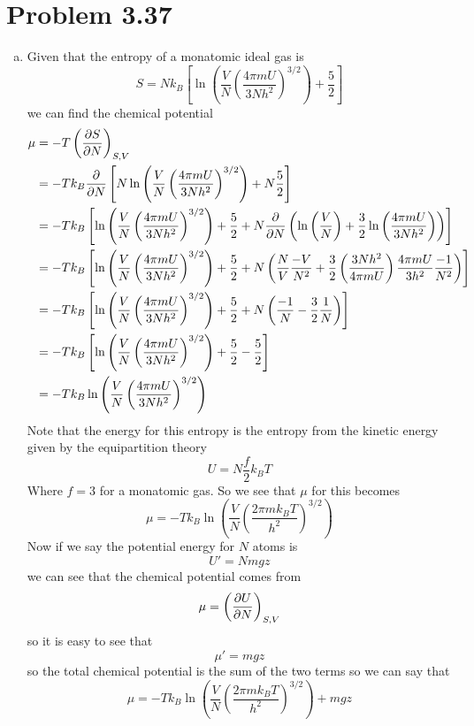 \documentclass[11pt]{article}
\numberwithin{equation}{section}
\begin{document}
\section{Problem 3.37}
\begin{enumerate}[(a)]
\item
Given that the entropy of a monatomic ideal gas is
$$S = Nk_B\left[\ln\left(\frac{V}{N}\left(\frac{4\pi mU}{3Nh^2}\right)^{3/2}\right)+\frac{5}{2}\right]$$
we can find the chemical potential 
\begin{align*}
\mu &= -T\left(\frac{\partial{S}}{\partial{N}}\right)_{S,V}\\
&= -Tk_B\frac{\partial{}}{\partial{N}}\left[N\ln\left(\frac{V}{N}\left(\frac{4\pi mU}{3Nh^2}\right)^{3/2}\right)+N\frac{5}{2}\right]\\
&= -Tk_B\left[\ln\left(\frac{V}{N}\left(\frac{4\pi mU}{3Nh^2}\right)^{3/2}\right)+ \frac{5}{2} + N\frac{\partial{}}{\partial{N}}\left(\ln\left(\frac{V}{N}\right) + \frac{3}{2}\ln\left(\frac{4\pi mU}{3Nh^2}\right)\right) \right]\\
&= -Tk_B\left[\ln\left(\frac{V}{N}\left(\frac{4\pi mU}{3Nh^2}\right)^{3/2}\right)+ \frac{5}{2} + N\left(\frac{N}{V}\frac{-V}{N^2} + \frac{3}{2}\left(\frac{3Nh^2}{4\pi mU}\right)\frac{4\pi mU}{3h^2}\frac{-1}{N^2}\right) \right]\\
&= -Tk_B\left[\ln\left(\frac{V}{N}\left(\frac{4\pi mU}{3Nh^2}\right)^{3/2}\right)+ \frac{5}{2} + N\left(\frac{-1}{N} - \frac{3}{2}\frac{1}{N}\right) \right]\\
&= -Tk_B\left[\ln\left(\frac{V}{N}\left(\frac{4\pi mU}{3Nh^2}\right)^{3/2}\right)+ \frac{5}{2} -\frac{5}{2}\right]\\
&= -Tk_B\ln\left(\frac{V}{N}\left(\frac{4\pi mU}{3Nh^2}\right)^{3/2}\right)
\end{align*}
Note that the energy for this entropy is the entropy from the kinetic energy given by the equipartition theory
$$U = N\frac{f}{2}k_BT$$
Where $f=3$ for a monatomic gas. So we see that $\mu$ for this becomes
$$\mu = -Tk_B\ln\left(\frac{V}{N}\left(\frac{2\pi mk_BT}{h^2}\right)^{3/2}\right)$$
Now if we say the potential energy for $N$ atoms is 
$$U' = Nmgz$$
we can see that the chemical potential comes from
$$\mu = \left(\frac{\partial{U}}{\partial{N}}\right)_{S,V}$$
so it is easy to see that
$$\mu' = mgz$$
so the total chemical potential is the sum of the two terms so we can say that 
$$\mu = -Tk_B\ln\left(\frac{V}{N}\left(\frac{2\pi mk_BT}{h^2}\right)^{3/2}\right) + mgz$$


\end{enumerate}
\end{document}
